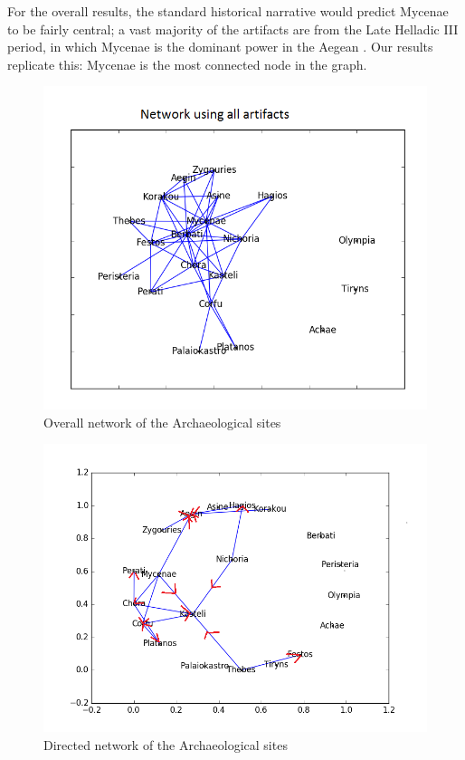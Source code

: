   
For the overall results, the standard historical narrative would predict Mycenae to be fairly central; a vast majority of the artifacts are from the Late Helladic III period, in which Mycenae is the dominant power in the Aegean \cite{demand2011mediterranean}. Our results replicate this: Mycenae is the most connected node in the graph. 



\begin{figure}
\includegraphics[width=\textwidth]{Overall_Network.png}
\caption{Overall network of the Archaeological sites}
\label{fig:overall}
\end{figure}


\begin{figure}
\includegraphics[width=\textwidth]{Overall_network_direct.png}
\caption{Directed network of the Archaeological sites}
\label{fig:overall}
\end{figure}
